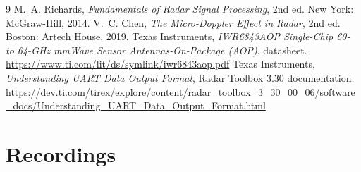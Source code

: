 \documentclass[11pt,a4paper]{article}
\begin{document}
\begin{thebibliography}{9}\small
{} M.~A. Richards, \emph{Fundamentals of Radar Signal Processing}, 2nd ed. New York: McGraw-Hill, 2014.
 V.~C. Chen, \emph{The Micro-Doppler Effect in Radar}, 2nd ed. Boston: Artech House, 2019.
 Texas Instruments, \emph{IWR6843AOP Single-Chip 60- to 64-GHz mmWave Sensor Antennas-On-Package (AOP)}, datasheet. \url{https://www.ti.com/lit/ds/symlink/iwr6843aop.pdf}
 Texas Instruments, \emph{Understanding UART Data Output Format}, Radar Toolbox 3.30 documentation. \url{https://dev.ti.com/tirex/explore/content/radar_toolbox_3_30_00_06/software_docs/Understanding_UART_Data_Output_Format.html}
\end{thebibliography}

\appendix
\section{Recordings}\label{app:data}
\end{document}
